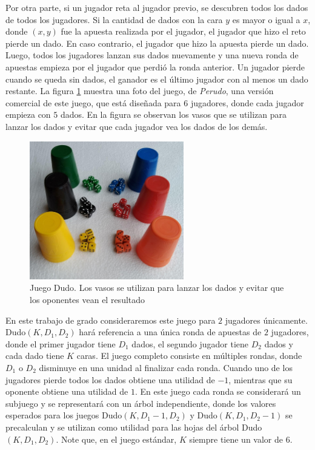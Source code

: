 Por otra parte, si un jugador reta al jugador previo, se descubren todos los dados de todos los jugadores. Si la cantidad de dados con la cara $y$ es mayor o igual a $x$, donde $(x, y)$ fue la apuesta realizada por el jugador, el jugador que hizo el reto pierde un dado. En caso contrario, el jugador que hizo la apuesta pierde un dado. Luego, todos los jugadores lanzan sus dados nuevamente y una nueva ronda de apuestas empieza por el jugador que perdió la ronda anterior. Un jugador pierde cuando se queda sin dados, el ganador es el último jugador con al menos un dado restante. La figura \ref{fig:dudo} muestra una foto del juego, de \textit{Perudo}, una versión comercial de este juego, que está diseñada para $6$ jugadores, donde cada jugador empieza con $5$ dados. En la figura se observan los vasos que se utilizan para lanzar los dados y evitar que cada jugador vea los dados de los demás.

\begin{figure}[htb]
\caption[Juego Dudo]{Juego Dudo. Los vasos se utilizan para lanzar los dados y evitar que los oponentes vean el resultado}
\label{fig:dudo}
\centering
\includegraphics[width=0.6\textwidth]{figuras/dudo.jpg}
\end{figure}

En este trabajo de grado consideraremos este juego para $2$ jugadores únicamente. Dudo$(K, D_1, D_2)$ hará referencia a una única ronda de apuestas de $2$ jugadores, donde el primer jugador tiene $D_1$ dados, el segundo jugador tiene $D_2$ dados y cada dado tiene $K$ caras. El juego completo consiste en múltiples rondas, donde $D_1$ o $D_2$ disminuye en una unidad al finalizar cada ronda. Cuando uno de los jugadores pierde todos los dados obtiene una utilidad de $-1$, mientras que su oponente obtiene una utilidad de $1$. En este juego cada ronda se considerará un subjuego y se representará con un árbol independiente, donde los valores esperados para los juegos Dudo$(K, D_1 - 1, D_2)$ y Dudo$(K, D_1, D_2 - 1)$ se precalculan y se utilizan como utilidad para las hojas del árbol Dudo$(K, D_1, D_2)$. Note que, en el juego estándar, $K$ siempre tiene un valor de $6$.

